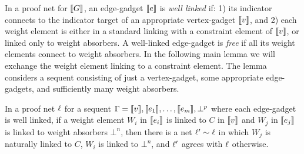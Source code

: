 \documentclass[conference]{IEEEtran}
\begin{document}
In a proof net for $\llbracket G\rrbracket$, an edge-gadget $\llbracket e\rrbracket$ is \emph{well linked} if: 1) its indicator connects to the indicator target of an appropriate vertex-gadget $\llbracket v\rrbracket$, and 2) each weight element is either in a standard linking with a constraint element of $\llbracket v\rrbracket$, or linked only to weight absorbers.
%
A well-linked edge-gadget is \emph{free} if all its weight elements connect to weight absorbers.
%
In the following main lemma we will exchange the weight element linking to a constraint element.
%
The lemma considers a sequent consisting of just a vertex-gadget, some appropriate edge-gadgets, and sufficiently many weight absorbers.


\begin{lemma}
\label{lem:octopus roll}
In a proof net $\ell$ for a sequent $\Gamma=\llbracket v\rrbracket,\llbracket e_1\rrbracket,\dotsc,\llbracket e_m\rrbracket,\bot^p$ where each edge-gadget is well linked, if a weight element $W_i$ in $\llbracket e_i\rrbracket$ is linked to $C$ in $\llbracket v\rrbracket$ and $W_j$ in $\llbracket e_j\rrbracket$ is linked to weight absorbers $\bot^n$, then there is a net $\links'\perm\links$ in which $W_j$ is naturally linked to $C$, $W_i$ is linked to $\bot^n$, and $\ell'$ agrees with $\ell$ otherwise.
\end{lemma}


\renewcommand\scalefactor{0.88}

\newcommand\displayOcto[1]{%
 \NoIndent{%
   \smallskip%
   \centerline{%
	 \scale{#1}%
  }}%
  \bigskip%
}
\end{document}
